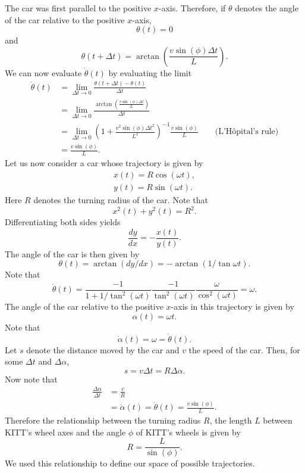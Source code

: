 \documentclass[11pt,titlepage]{report}
\begin{document}
The car was first parallel to the positive $x$-axis. Therefore, if $\theta$ denotes the angle of the car relative to the positive $x$-axis,
\[
	\theta(t) = 0
\]
and
\[
	\theta(t+\Delta t)=\arctan{\left(\frac{v \sin{(\phi)}\Delta t}{L}\right)}.
\]
We can now evaluate $\dot{\theta}(t)$ by evaluating the limit
\begin{align}
	\dot{\theta}(t) &= \lim_{\Delta t \rightarrow 0} \frac{\theta(t+\Delta t)-\theta(t)}{\Delta t} \nonumber \\
	&= \lim_{\Delta t \rightarrow 0} \frac{\arctan{\left(\frac{v \sin{(\phi)}\Delta t}{L}\right)}}{\Delta t} \nonumber \\
	&= \lim_{\Delta t \rightarrow 0} \left(1+\frac{v^2 \sin{(\phi)}\Delta t^2}{L^2}\right)^{-1}\frac{v \sin{(\phi)}}{L} \quad \quad \text{(L'H\^opital's rule)} \nonumber \\
	&= \frac{v \sin{(\phi)}}{L}. \label{eq:steering-derivative}
\end{align}
Let us now consider a car whose trajectory is given by
\begin{align*}
	x(t) = R \cos{(\omega t)}, \\
	y(t) = R \sin{(\omega t)}.
\end{align*}
Here $R$ denotes the turning radius of the car. Note that
\[
	x^2(t)+y^2(t)=R^2.
\]
Differentiating both sides yields
\[
	\frac{dy}{dx}=-\frac{x(t)}{y(t)}.
\]
The angle of the car is then given by
\[
	\theta(t) = \arctan{(dy/dx)} = -\arctan{(1/\tan{\omega t})}.
\]
Note that
\[
	\dot{\theta}(t) = \frac{-1}{1+1/\tan^2{(\omega t)}} \frac{-1}{\tan^2{(\omega t)}} \frac{\omega}{\cos^2{(\omega t)}} = \omega.
\]
The angle of the car relative to the positive $x$-axis in this trajectory is given by
\[
	\alpha(t) = \omega t.
\]
Note that
\[
	\dot{\alpha}(t) = \omega = \dot{\theta}(t).
\]
Let $s$ denote the distance moved by the car and $v$ the speed of the car. Then, for some $\Delta t$ and $\Delta \alpha$,
\[
	s = v \Delta t = R \Delta \alpha.
\]
Now note that
\begin{align*}
	\frac{\Delta \alpha}{\Delta t} &= \frac{v}{R} \\
	&=\dot{\alpha}(t)=\dot{\theta}(t) = \frac{v \sin{(\phi)}}{L}.
\end{align*}
Therefore the relationship between the turning radius $R$, the length $L$ between KITT's wheel axes and the angle $\phi$ of KITT's wheels is given by
\begin{equation} \label{eq:steering-radius}
	R = \frac{L}{\sin{(\phi)}}.
\end{equation}
We used this relationship to define our space of possible trajectories.
\end{document}
